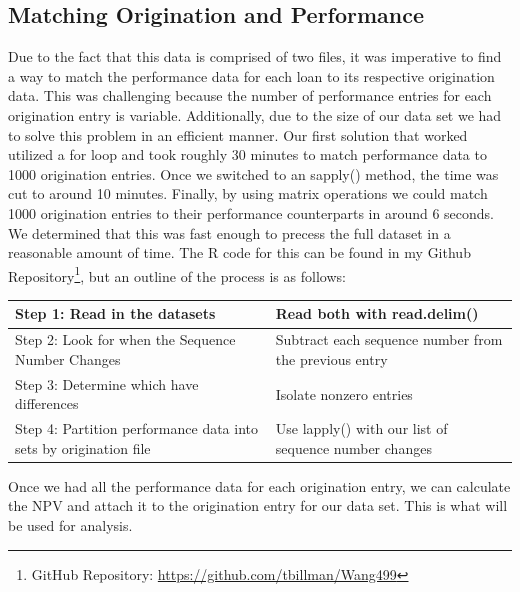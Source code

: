 \documentclass[12 pt]{uncw_thesis}
\theoremstyle{plain}
\theoremstyle{remark}
\theoremstyle{definition}
\begin{document}
\subsection{Matching Origination and Performance}
Due to the fact that this data is comprised of two files, it was imperative to find a way to match the performance data for each loan to its respective origination data. This was challenging because the number of performance entries for each origination entry is variable. Additionally, due to the size of our data set we had to solve this problem in an efficient manner. Our first solution that worked utilized a for loop and took roughly 30 minutes to match performance data to 1000 origination entries. Once we switched to an sapply() method, the time was cut to around 10 minutes. Finally, by using matrix operations we could match 1000 origination entries to their performance counterparts in around 6 seconds. We determined that this was fast enough to precess the full dataset in a reasonable amount of time. The R code for this can be found in my Github Repository\footnote{GitHub Repository: \href{https://github.com/tbillman/Wang499}{https://github.com/tbillman/Wang499}}, but an outline of the process is as follows:
\begin{center}
	\begin{tabular}{|M{6cm}|M{8cm}|} 
		\hline
		Step 1: Read in the datasets & Read both with read.delim()\\ 
		\hline
		Step 2: Look for when the Sequence Number Changes& Subtract each sequence number from the previous entry\\
		\hline
		Step 3: Determine which have differences & Isolate nonzero entries \\
		\hline
		Step 4: Partition performance data into sets by origination file & Use lapply() with our list of sequence number changes\\
		\hline
	\end{tabular}
\end{center}
Once we had all the performance data for each origination entry, we can calculate the NPV and attach it to the origination entry for our data set. This is what will be used for analysis.
\end{document}
